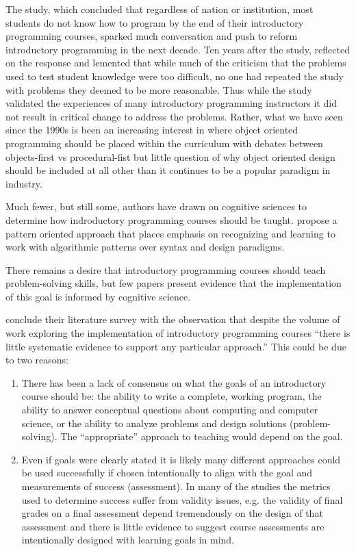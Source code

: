 \documentclass[12pt]{article}
\let\textcite=\autocite
\begin{document}
The \textcite{mccracken_multinational_2001} study, which concluded that
regardless of nation or institution, most students do not know how to
program by the end of their introductory programming courses, sparked
much conversation and push to reform introductory programming in the
next decade. Ten years after the
\citeauthor{mccracken_multinational_2001} study,
\textcite{lister_ten_2011} reflected on the response and lemented that
while much of the criticism that the problems used to test student
knowledge were too difficult, no one had repeated the study with
problems they deemed to be more reasonable. Thus while the
\citeauthor{mccracken_multinational_2001} study validated the
experiences of many introductory programming instructors it did not
result in critical change to address the problems. Rather, what we
have seen since the 1990s is been an increasing interest in where
object oriented programming should be placed within the curriculum
with debates between objects-first vs procedural-fist but little
question of why object oriented design should be included at all other
than it continues to be a popular paradigm in industry.

Much fewer, but still some, authors have drawn on cognitive sciences
to determine how indroductory programming courses should be
taught. \textcite{muller_pattern_2005} propose a pattern oriented
approach that places emphasis on recognizing and learning to work with
algorithmic patterns over syntax and design paradigms.

There remains a desire that introductory programming courses should
teach problem-solving skills, but few papers present evidence that the
implementation of this goal is informed by cognitive science.

\citeauthor{pears_survey_2007-1} conclude their
\citeyear{pears_survey_2007-1} literature survey with the observation
that despite the volume of work exploring the implementation of
introductory programming courses “there is little systematic evidence
to support any particular approach.”\autocite{pears_survey_2007-1} This
could be due to two reasons:

\begin{enumerate}
\item There has been a lack of consensus on what the goals of an
  introductory course should be: the ability to write a complete,
  working program, the ability to answer conceptual questions about
  computing and computer science, or the ability to analyze problems
  and design solutions (problem-solving). The “appropriate” approach
  to teaching would depend on the goal.

\item Even if goals were clearly stated it is likely many different
  approaches could be used successfully if chosen intentionally to
  align with the goal and measurements of success (assessment). In
  many of the studies the metrics used to determine success suffer
  from validity issues, e.g. the validity of final grades on a final
  assessment depend tremendously on the design of that assessment and
  there is little evidence to suggest course assessments are
  intentionally designed with learning goals in mind.
\end{enumerate}
\end{document}
